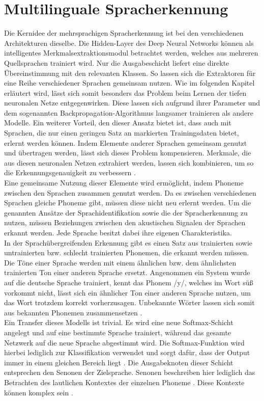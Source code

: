 \section{Multilinguale Spracherkennung}
Die Kernidee der mehrsprachigen Spracherkennung ist bei den verschiedenen Architekturen dieselbe. Die Hidden-Layer des Deep Neural Networks können als intelligentes Merkmalsextraktionsmodul betrachtet werden, welches aus mehreren Quellsprachen trainiert wird. Nur die Ausgabeschicht liefert eine direkte Übereinstimmung mit den relevanten Klassen. So lassen sich die Extraktoren für eine Reihe verschiedener Sprachen gemeinsam nutzen. 
Wie im folgenden Kapitel erläutert wird, lässt sich somit besonders das Problem beim Lernen der tiefen neuronalen Netze entgegenwirken. Diese lassen sich aufgrund ihrer Parameter und dem sogenannten Backpropagation-Algorithmus langsamer trainieren als andere Modelle. Ein weiterer Vorteil, den dieser Ansatz bietet ist, dass auch mit Sprachen, die nur einen geringen Satz an markierten Trainingsdaten bietet, erlernt werden können. Indem Elemente anderer Sprachen gemeinsam genutzt und übertragen werden, lässt sich dieses Problem kompensieren. Merkmale, die aus diesen neuronalen Netzen extrahiert werden, lassen sich kombinieren, um so die Erkennungsgenauigkeit zu verbessern {\cite{Yu.2014}}.
\\
Eine gemeinsame Nutzung dieser Elemente wird ermöglicht, indem Phoneme zwischen den Sprachen zusammen genutzt werden. Da es zwischen verschiedenen Sprachen gleiche Phoneme gibt, müssen diese nicht neu erlernt werden. Um die genannten Ansätze der Sprachidentifikation sowie die der Spracherkennung zu nutzen, müssen Beziehungen zwischen den akustischen Signalen der Sprachen erkannt werden. Jede Sprache besitzt dabei ihre eigenen Charakteristika. 
\\
In der Sprachübergreifenden Erkennung gibt es einen Satz aus trainierten sowie untrainierten bzw. schlecht trainierten Phonemen, die erkannt werden müssen. Die Töne einer Sprache werden mit einem ähnlichen bzw. dem ähnlichsten trainierten Ton einer anderen Sprache ersetzt. Angenommen ein System wurde auf die deutsche Sprache trainiert, kennt das Phonem /y/, welches im Wort süß vorkommt nicht, lässt sich ein ähnlicher Ton einer anderen Sprache nutzen, um das Wort trotzdem korrekt vorherzusagen. Unbekannte Wörter lassen sich somit aus bekannten Phonemen zusammensetzen {\cite{UEBLER200153}}. 
\\
Ein Transfer dieses Modells ist trivial. Es wird eine neue Softmax-Schicht angelegt und auf eine bestimmte Sprache trainiert, während das gesamte Netzwerk auf die neue Sprache abgestimmt wird. Die Softmax-Funktion wird hierbei lediglich zur Klassifikation verwendet und sorgt dafür, dass der Output immer in einem gleichen Bereich liegt {\cite{Yu.2014}}. Die Ausgabeknoten dieser Schicht entsprechen den Senonen der Zielsprache. Senonen beschreiben hier lediglich das Betrachten des lautlichen Kontextes der einzelnen Phoneme {\cite{Yu.2014}}. Diese Kontexte können komplex sein {\cite{basic_concepts}}.
